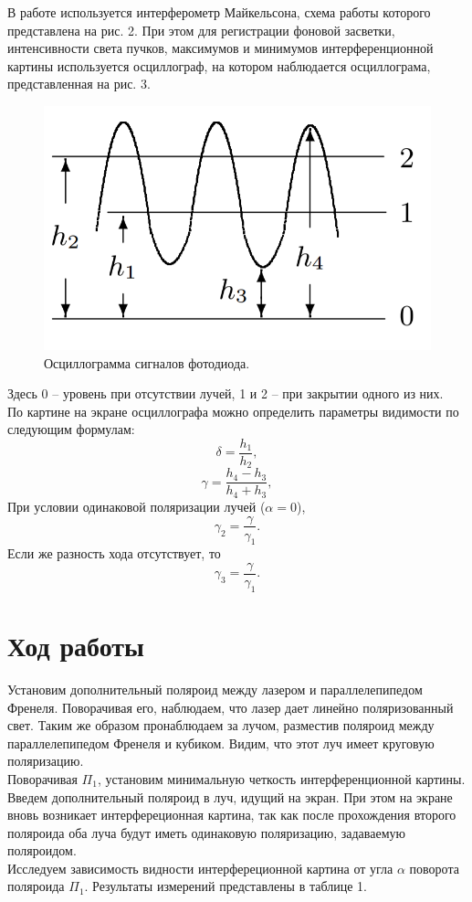 \documentclass[a4paper,12pt]{article}
\begin{document}
\noindent В работе используется интерферометр Майкельсона, схема работы которого представлена на рис. 2. При этом для регистрации фоновой засветки, интенсивности света пучков, максимумов и минимумов интерференционной картины используется осциллограф, на котором наблюдается осциллограма, представленная на рис. 3.
\begin{figure}[H]
\begin{center}
\includegraphics[scale=0.5]{3.png}
\end{center}
\caption{Осциллограмма сигналов фотодиода.}
\end{figure}
\noindent Здесь 0 -- уровень при отсутствии лучей, 1 и 2 -- при закрытии одного из них. \\
По картине на экране осциллографа можно определить параметры видимости по следующим формулам:
\begin{equation}
\delta = \dfrac{h_1}{h_2},
\end{equation}
\begin{equation}
\gamma = \dfrac{h_4 - h_3}{h_4 + h_3},
\end{equation}
При условии одинаковой поляризации лучей ($\alpha = 0$),
\begin{equation}
\gamma_2 = \dfrac{\gamma}{\gamma_1}.
\end{equation}
Если же разность хода отсутствует, то
\begin{equation}
\gamma_3 = \dfrac{\gamma}{\gamma_1}.
\end{equation}
\section*{Ход работы}
Установим дополнительный поляроид между лазером и параллелепипедом Френеля. Поворачивая его, наблюдаем, что лазер дает линейно поляризованный свет. Таким же образом пронаблюдаем за лучом, разместив поляроид между параллелепипедом Френеля и кубиком. Видим, что этот луч имеет круговую поляризацию. \\
Поворачивая $\Pi_1$, установим минимальную четкость интерференционной картины. Введем дополнительный поляроид в луч, идущий на экран. При этом на экране вновь возникает интерфереционная картина, так как после прохождения второго поляроида оба луча будут иметь одинаковую поляризацию, задаваемую поляроидом.\\
Исследуем зависимость видности интерфереционной картина от угла $\alpha$ поворота поляроида $\Pi_1$. Результаты измерений представлены в таблице 1.
\end{document}

